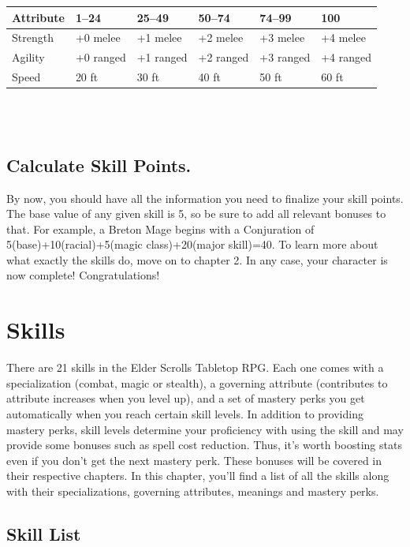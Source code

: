 \documentclass[12pt]{book}
\begin{document}
\begin{tabularx}{\textwidth}{|X|X|X|X|X|X|}
\hline
Attribute & 1--24 & 25--49 & 50--74 & 74--99 & 100\\ \hline
Strength & +0 melee & +1 melee & +2 melee & +3 melee & +4 melee\\ \hline
Agility & +0 ranged & +1 ranged & +2 ranged & +3 ranged & +4 ranged\\ \hline
Speed & 20 ft & 30 ft & 40 ft & 50 ft & 60 ft\\ \hline

\end{tabularx}\\~\\

\section{Calculate Skill Points.}
By now, you should have all the information you need to finalize your skill points. The base value of any given skill is 5, so be sure to add all relevant bonuses to that. For example, a Breton Mage begins with a Conjuration of 5(base)+10(racial)+5(magic class)+20(major skill)=40. To learn more about what exactly the skills do, move on to chapter 2. In any case, your character is now complete! Congratulations!

\chapter{Skills}

There are 21 skills in the Elder Scrolls Tabletop RPG. Each one comes with a specialization (combat, magic or stealth), a governing attribute (contributes to attribute increases when you level up), and a set of mastery perks you get automatically when you reach certain skill levels. In addition to providing mastery perks, skill levels determine your proficiency with using the skill and may provide some bonuses such as spell cost reduction. Thus, it's worth boosting stats even if you don't get the next mastery perk. These bonuses will be covered in their respective chapters. In this chapter, you'll find a list of all the skills along with their specializations, governing attributes, meanings and mastery perks.

\section{Skill List}
\end{document}
